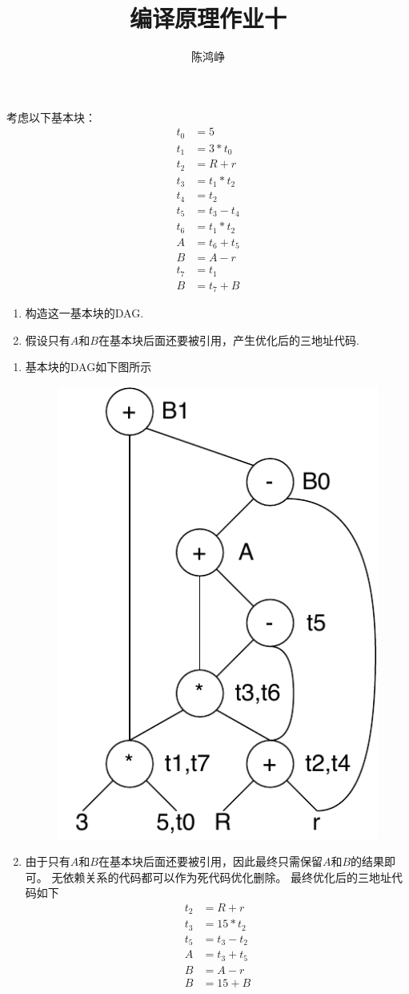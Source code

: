 \documentclass[logo,reportComp]{thesis}
\title{编译原理作业十}
\subtitle{}
\author{陈鸿峥}
\begin{document}
\maketitle

\begin{question}
考虑以下基本块：
\[\begin{aligned}
t_0 &= 5\\
t_1 &= 3 * t_0\\
t_2 &= R + r\\
t_3 &= t_1 * t_2\\
t_4 &= t_2\\
t_5 &= t_3 - t_4\\
t_6 &= t_1 * t_2\\
A   &= t_6 + t_5\\
B   &= A - r\\
t_7 &= t_1\\
B   &= t_7 + B
\end{aligned}\]
\begin{enumerate}
\item 构造这一基本块的DAG.
\item 假设只有$A$和$B$在基本块后面还要被引用，产生优化后的三地址代码.
\end{enumerate}
\end{question}
\begin{answer}
\begin{enumerate}
	\item 基本块的DAG如下图所示
	\begin{figure}[H]
	\centering
	\includegraphics[width=0.4\linewidth]{fig/dag-1.pdf}
	\end{figure}
	\item 由于只有$A$和$B$在基本块后面还要被引用，因此最终只需保留$A$和$B$的结果即可。
	无依赖关系的代码都可以作为死代码优化删除。
	最终优化后的三地址代码如下
\[\begin{aligned}
t_2 &= R + r\\
t_3 &= 15 * t_2\\
t_5 &= t_3 - t_2\\
A &= t_3 + t_5\\
B &= A - r\\
B &= 15 + B
\end{aligned}\]
\end{enumerate}
\end{answer}
\end{document}
